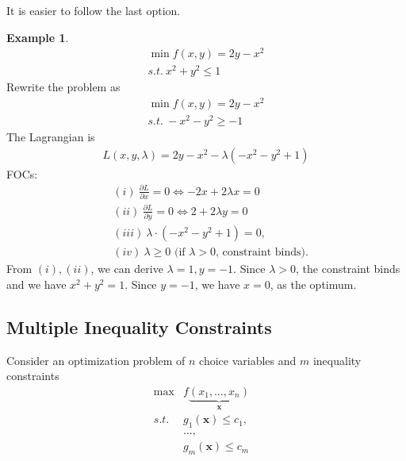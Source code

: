 \documentclass[10pt,a4paper]{book}
\theoremstyle{definition}\newtheorem{definition}{Definition}
\theoremstyle{definition}\newtheorem{fact}{Fact}
\theoremstyle{definition}\newtheorem{ex}{Ex.}
\theoremstyle{definition}\newtheorem{project}{Project}
\theoremstyle{definition}\newtheorem{problem}{Problem}
\theoremstyle{definition}\newtheorem{example}{Example}
\numberwithin{theorem}{chapter}
\numberwithin{corollary}{chapter}
\numberwithin{assumption}{chapter}
\numberwithin{definition}{chapter}
\numberwithin{prop}{chapter}
\numberwithin{notation}{chapter}
\numberwithin{problem}{chapter}
\numberwithin{example}{chapter}
\numberwithin{fact}{chapter}
\numberwithin{ex}{chapter}
\def\x{\mathbf x}
\begin{document}
	It is easier to follow the last option.
	\begin{example} \label{example:kkt1}
		\begin{align*}
			\min f(x,y) = 2y - x^2  \\
			s.t. \  x^2 + y^2 \leq 1
		\end{align*}
		Rewrite the problem as
		\begin{align*}
			\min f(x,y) = 2y - x^2  \\
			s.t. \  - x^2 - y^2 \geq -1
		\end{align*}
		The Lagrangian is
		\begin{align*}
			L(x,y,\lambda) = 2y - x^2 - \lambda (-x^2 - y^2 + 1)
		\end{align*}
		FOCs:
		\begin{align*}
			&(i) \ \frac{\partial L}{\partial x} = 0 \iff -2x + 2\lambda x = 0 \\
			&(ii) \ \frac{\partial L}{\partial y} = 0 \iff 2 + 2\lambda y = 0 \\
			&(iii) \ \lambda \cdot (- x^2 - y^2  +1) = 0, \\
			&(iv) \ \lambda \geq 0  \text{ (if $\lambda > 0$, constraint binds).}
		\end{align*}
		From $(i), (ii)$, we can derive $\lambda = 1, y = -1$. Since $\lambda > 0$, the constraint binds and we have $x^2 + y^2 = 1$. Since $y=-1$, we have $x=0$, as the optimum.
	\end{example}
	
		
	\subsection{Multiple Inequality Constraints}
	Consider an optimization problem of $n$ choice variables and $m$ inequality constraints
	\begin{align}
		\max &f\underbrace{(x_1, \dots, x_n)}_{\x} \label{eq:kkt_prob} &                                                          \\
		s.t. &g_1 (\x) \leq c_1, \nonumber &                                                          \\
		& \dots, \nonumber                                         \\
		& g_m (\x) \leq c_m \nonumber                              
	\end{align}
	
\end{document}
